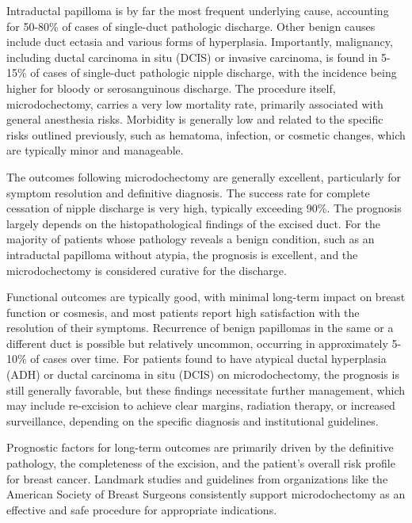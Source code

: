 Intraductal papilloma is by far the most frequent underlying cause, accounting for 50-80\% of cases of single-duct pathologic discharge. Other benign causes include duct ectasia and various forms of hyperplasia. Importantly, malignancy, including ductal carcinoma in situ (DCIS) or invasive carcinoma, is found in 5-15\% of cases of single-duct pathologic nipple discharge, with the incidence being higher for bloody or serosanguinous discharge. The procedure itself, microdochectomy, carries a very low mortality rate, primarily associated with general anesthesia risks. Morbidity is generally low and related to the specific risks outlined previously, such as hematoma, infection, or cosmetic changes, which are typically minor and manageable.

The outcomes following microdochectomy are generally excellent, particularly for symptom resolution and definitive diagnosis. The success rate for complete cessation of nipple discharge is very high, typically exceeding 90\%. The prognosis largely depends on the histopathological findings of the excised duct. For the majority of patients whose pathology reveals a benign condition, such as an intraductal papilloma without atypia, the prognosis is excellent, and the microdochectomy is considered curative for the discharge. 

Functional outcomes are typically good, with minimal long-term impact on breast function or cosmesis, and most patients report high satisfaction with the resolution of their symptoms. Recurrence of benign papillomas in the same or a different duct is possible but relatively uncommon, occurring in approximately 5-10\% of cases over time. For patients found to have atypical ductal hyperplasia (ADH) or ductal carcinoma in situ (DCIS) on microdochectomy, the prognosis is still generally favorable, but these findings necessitate further management, which may include re-excision to achieve clear margins, radiation therapy, or increased surveillance, depending on the specific diagnosis and institutional guidelines. 

Prognostic factors for long-term outcomes are primarily driven by the definitive pathology, the completeness of the excision, and the patient's overall risk profile for breast cancer. Landmark studies and guidelines from organizations like the American Society of Breast Surgeons consistently support microdochectomy as an effective and safe procedure for appropriate indications.

